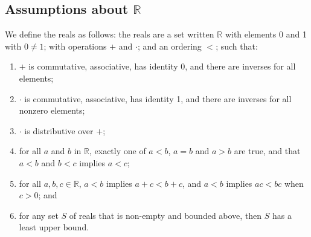 \subsection{Assumptions about $\mathbb R$}
We define the reals as follows: the reals are a set written $\mathbb R$ with elements 0 and 1 with $0 \neq 1$; with operations $+$ and $\cdot$; and an ordering $<$; such that:
\begin{enumerate}
	\item $+$ is commutative, associative, has identity 0, and there are inverses for all elements;
	\item $\cdot$ is commutative, associative, has identity 1, and there are inverses for all nonzero elements;
	\item $\cdot$ is distributive over $+$;
	\item for all $a$ and $b$ in $\mathbb R$, exactly one of $a<b$, $a=b$ and $a>b$ are true, and that $a<b$ and $b<c$ implies $a<c$;
	\item for all $a, b, c \in \mathbb R$, $a<b$ implies $a + c < b + c$, and $a<b$ implies $ac < bc$ when $c > 0$; and
	\item for any set $S$ of reals that is non-empty and bounded above, then $S$ has a least upper bound.
\end{enumerate}
